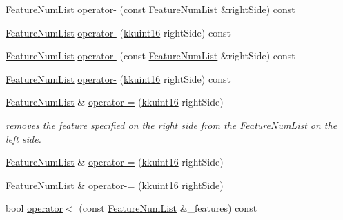 \begin{DoxyCompactItemize}
\hyperlink{class_k_k_m_l_l_1_1_feature_num_list}{Feature\+Num\+List} \hyperlink{class_k_k_m_l_l_1_1_feature_num_list_a2d0f9a189abe2a7cec9c7f365817eb10}{operator-\/} (const \hyperlink{class_k_k_m_l_l_1_1_feature_num_list}{Feature\+Num\+List} \&right\+Side) const 
\item 
\hyperlink{class_k_k_m_l_l_1_1_feature_num_list}{Feature\+Num\+List} \hyperlink{class_k_k_m_l_l_1_1_feature_num_list_abff47859d7cd3757e06230350b76e634}{operator-\/} (\hyperlink{namespace_k_k_b_aa8c7d4d30381c8a0b6fce68974a9c8a9}{kkuint16} right\+Side) const 
\item 
\hyperlink{class_k_k_m_l_l_1_1_feature_num_list}{Feature\+Num\+List} \hyperlink{class_k_k_m_l_l_1_1_feature_num_list_a2d0f9a189abe2a7cec9c7f365817eb10}{operator-\/} (const \hyperlink{class_k_k_m_l_l_1_1_feature_num_list}{Feature\+Num\+List} \&right\+Side) const 
\item 
\hyperlink{class_k_k_m_l_l_1_1_feature_num_list}{Feature\+Num\+List} \hyperlink{class_k_k_m_l_l_1_1_feature_num_list_abff47859d7cd3757e06230350b76e634}{operator-\/} (\hyperlink{namespace_k_k_b_aa8c7d4d30381c8a0b6fce68974a9c8a9}{kkuint16} right\+Side) const 
\item 
\hyperlink{class_k_k_m_l_l_1_1_feature_num_list}{Feature\+Num\+List} \& \hyperlink{class_k_k_m_l_l_1_1_feature_num_list_ab0f57bc5621b1537c3518ec2655bf0db}{operator-\/=} (\hyperlink{namespace_k_k_b_aa8c7d4d30381c8a0b6fce68974a9c8a9}{kkuint16} right\+Side)
\begin{DoxyCompactList}\small\item\em removes the feature specified on the right side from the \hyperlink{class_k_k_m_l_l_1_1_feature_num_list}{Feature\+Num\+List} on the left side. \end{DoxyCompactList}\item 
\hyperlink{class_k_k_m_l_l_1_1_feature_num_list}{Feature\+Num\+List} \& \hyperlink{class_k_k_m_l_l_1_1_feature_num_list_adcdc0c07691b6867a40e43941c399df8}{operator-\/=} (\hyperlink{namespace_k_k_b_aa8c7d4d30381c8a0b6fce68974a9c8a9}{kkuint16} right\+Side)
\item 
\hyperlink{class_k_k_m_l_l_1_1_feature_num_list}{Feature\+Num\+List} \& \hyperlink{class_k_k_m_l_l_1_1_feature_num_list_adcdc0c07691b6867a40e43941c399df8}{operator-\/=} (\hyperlink{namespace_k_k_b_aa8c7d4d30381c8a0b6fce68974a9c8a9}{kkuint16} right\+Side)
\item 
bool \hyperlink{class_k_k_m_l_l_1_1_feature_num_list_af7af184fa324bf97cee8ddce1d0576bc}{operator$<$} (const \hyperlink{class_k_k_m_l_l_1_1_feature_num_list}{Feature\+Num\+List} \&\+\_\+features) const 

\end{DoxyCompactItemize}
